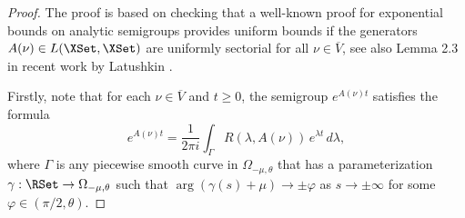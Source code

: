 \documentclass[a4paper]{siamart190516}
\begin{document}
 \begin{proof}
 The proof is based on checking that a well-known proof for exponential bounds on analytic semigroups provides uniform bounds if the generators $A(\nu) \in L(\XSet,\XSet)$ are uniformly sectorial for all $\nu \in \overline{V}$, see also Lemma 2.3 in recent work by Latushkin \cite{LaPo24}.
 
Firstly, note that for each $\nu \in \overline{V}$ and $t \geq 0$, the semigroup $e^{A(\nu) t}$ satisfies the formula
 \[
 e^{A(\nu) t} = \frac{1}{2\pi i} \int_{\Gamma} R(\lambda, A(\nu)) \, e^{\lambda t} \, d\lambda,
 \]
 where $\Gamma$ is any piecewise smooth curve in  $\Omega_{-\mu, \theta}$ that has a parameterization $\gamma : \RSet \rightarrow \Omega_{-\mu, \theta}$ such that $\arg(\gamma(s) + \mu) \rightarrow \pm \varphi$ as $s \rightarrow \pm \infty$ for some $\varphi \in (\pi/2,\theta)$. 
 

\end{proof}
\end{document}
